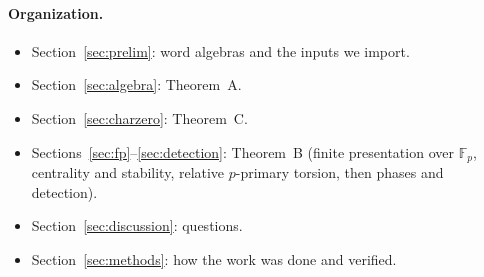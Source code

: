 \documentclass[11pt]{article}
\numberwithin{equation}{section}
\theoremstyle{definition}
\theoremstyle{remark}
\newcommand{\F}{\mathbb F}
\begin{document}
\paragraph{Organization.}
\begin{itemize}[leftmargin=*]
\item Section~\ref{sec:prelim}: word algebras and the inputs we import.
\item Section~\ref{sec:algebra}: Theorem~A.
\item Section~\ref{sec:charzero}: Theorem~C.
\item Sections~\ref{sec:fp}--\ref{sec:detection}: Theorem~B (finite presentation over $\F_p$, centrality and stability,
  relative $p$-primary torsion, then phases and detection).
\item Section~\ref{sec:discussion}: questions.
\item Section~\ref{sec:methods}: how the work was done and verified.
\end{itemize}








\end{document}
